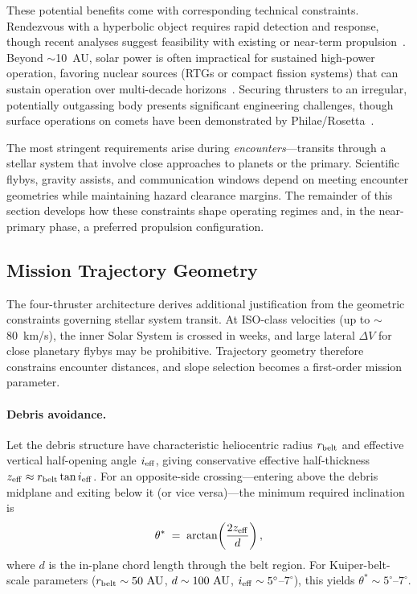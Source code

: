 \documentclass{article}
\begin{document}
These potential benefits come with corresponding technical constraints. Rendezvous with a hyperbolic object requires rapid detection and response, though recent analyses suggest feasibility with existing or near-term propulsion~\cite{landau2023iso,loeb2025intercepting,linares2024statite}. Beyond $\sim$10~AU, solar power is often impractical for sustained high-power operation, favoring nuclear sources (RTGs or compact fission systems) that can sustain operation over multi-decade horizons~\cite{gibson2018krusty}. Securing thrusters to an irregular, potentially outgassing body presents significant engineering challenges, though surface operations on comets have been demonstrated by Philae/Rosetta~\cite{altwegg2019rosina}.


The most stringent requirements arise during \emph{encounters}---transits through a stellar system that involve close approaches to planets or the primary. Scientific flybys, gravity assists, and communication windows depend on meeting encounter geometries while maintaining hazard clearance margins. The remainder of this section develops how these constraints shape operating regimes and, in the near-primary phase, a preferred propulsion configuration.

\subsection{Mission Trajectory Geometry}
\label{sec:trajectory_geometry}

The four-thruster architecture derives additional justification from the geometric constraints governing stellar system transit. At ISO-class velocities (up to $\sim$80~km/s), the inner Solar System is crossed in weeks, and large lateral $\Delta V$ for close planetary flybys may be prohibitive. Trajectory geometry therefore constrains encounter distances, and slope selection becomes a first-order mission parameter.

\paragraph{Debris avoidance.}
Let the debris structure have characteristic heliocentric radius $r_{\rm belt}$ and effective vertical half-opening angle $i_{\rm eff}$, giving conservative effective half-thickness $z_{\rm eff}\approx r_{\rm belt}\tan i_{\rm eff}$. For an opposite-side crossing---entering above the debris midplane and exiting below it (or vice versa)---the minimum required inclination is
\begin{equation}
\theta^* \;=\; \arctan\!\left(\frac{2z_{\rm eff}}{d}\right),
\end{equation}
where $d$ is the in-plane chord length through the belt region. For Kuiper-belt-scale parameters ($r_{\rm belt}\sim 50~{\rm AU}$, $d\sim 100~{\rm AU}$, $i_{\rm eff}\sim 5^\circ$--$7^\circ$), this yields $\theta^*\sim 5^\circ$--$7^\circ$.
\end{document}

